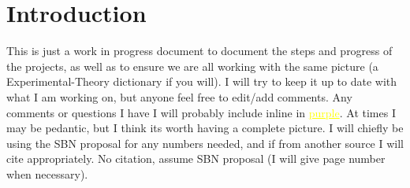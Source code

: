 \documentclass[12pt, a4paper]{article}
\newcommand{\newtext}[2]{\textcolor{#1}{\ul{#2}}}
\begin{document}
 


\section{Introduction}
This is just a work in progress document to document the steps and progress of the projects, as well as to ensure we are all working with the same picture (a Experimental-Theory dictionary if you will). I will try to keep it up to date with what I am working on, but anyone feel free to edit/add comments. Any comments or questions I have I will probably include inline in \newtext{MARK}{purple}. At times I may be pedantic, but I think its worth having a complete picture. I will chiefly be using the SBN proposal for any numbers needed, and if from another source I will cite appropriately. No citation, assume SBN proposal (I will give page number when necessary). 
\end{document}
